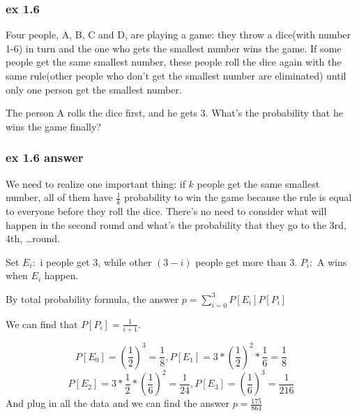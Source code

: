 \documentclass{beamer}
\begin{document}
\begin{frame}
    \frametitle{ex 1.6}

    Four people, A, B, C and D, are playing a game: they throw a dice(with number 1-6) in turn and the one who gets the smallest number wins the game. If some people get the same smallest number, these people roll the dice again with the same rule(other people who don't get the smallest number are eliminated) until only one person get the smallest number.\par
    The person A rolls the dice first, and he gets 3. What's the probability that he wins the game finally?
\end{frame}

\begin{frame}
    \frametitle{ex 1.6 answer}
    We need to realize one important thing: if $k$ people get the same smallest number, all of them have $\frac{1}{k}$ probability to win the game because the rule is equal to everyone before they roll the dice. There's no need to consider what will happen in the second round and what's the probability that they go to the 3rd, 4th, \dots round.\par
    Set $E_i:$ i people get 3, while other $(3-i)$ people get more than 3. $P_i:$ A wins when $E_i$ happen.\par
    By total probability formula, the answer $p=\sum\limits_{i=0}^3 P[E_i] P[P_i]$\par
    We can find that $P[P_i]=\frac{1}{i+1}$.\par
    \[P[E_0]=(\frac{1}{2})^3=\frac{1}{8}, P[E_1]=3*(\frac{1}{2})^2*\frac{1}{6}=\frac{1}{8}\]
    \[P[E_2]=3*\frac{1}{2}*(\frac{1}{6})^2=\frac{1}{24}, P[E_3]=(\frac{1}{6})^3=\frac{1}{216}\]
    And plug in all the data and we can find the answer $p=\frac{175}{864}$

\end{frame}
\end{document}
